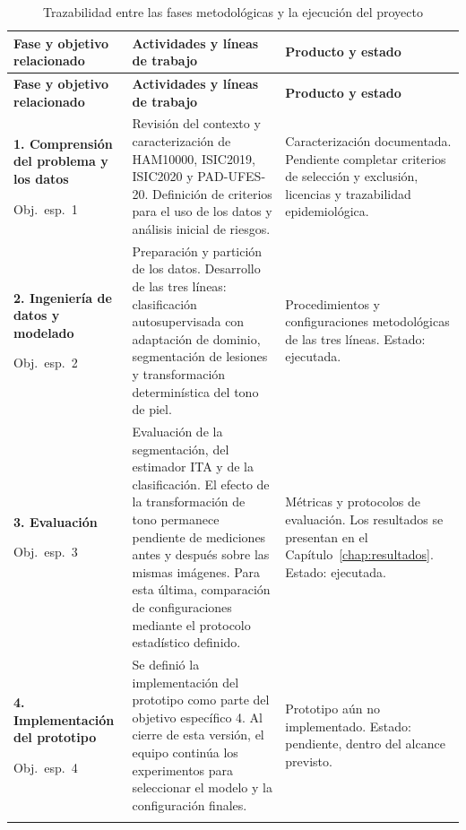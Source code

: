 \begingroup
\small
\singlespacing
\setlength{\tabcolsep}{4pt}
\begin{longtable}{@{}>{\raggedright\arraybackslash}p{}>{\raggedright\arraybackslash}p{}>{\raggedright\arraybackslash}p{}@{}}
\caption{Trazabilidad entre las fases metodológicas y la ejecución del proyecto}\label{tab:trazabilidad-fases}\\
\toprule
\textbf{Fase y objetivo relacionado} & \textbf{Actividades y líneas de trabajo} & \textbf{Producto y estado} \\
\midrule
\endfirsthead
\toprule
\textbf{Fase y objetivo relacionado} & \textbf{Actividades y líneas de trabajo} & \textbf{Producto y estado} \\
\midrule
\endhead
\bottomrule
\endfoot
\textbf{1. Comprensión del problema y los datos}\par\smallskip\mbox{Obj.\ esp.\ 1} & Revisión del contexto y caracterización de HAM10000, ISIC2019, ISIC2020 y PAD-UFES-20. Definición de criterios para el uso de los datos y análisis inicial de riesgos. & Caracterización documentada. Pendiente completar criterios de selección y exclusión, licencias y trazabilidad epidemiológica. \\
\addlinespace[5pt]
\textbf{2. Ingeniería de datos y modelado}\par\smallskip\mbox{Obj.\ esp.\ 2} & Preparación y partición de los datos. Desarrollo de las tres líneas: clasificación autosupervisada con adaptación de dominio, segmentación de lesiones y transformación determinística del tono de piel. & Procedimientos y configuraciones metodológicas de las tres líneas. Estado: ejecutada. \\
\addlinespace[5pt]
\textbf{3. Evaluación}\par\smallskip\mbox{Obj.\ esp.\ 3} & Evaluación de la segmentación, del estimador ITA y de la clasificación. El efecto de la transformación de tono permanece pendiente de mediciones antes y después sobre las mismas imágenes. Para esta última, comparación de configuraciones mediante el protocolo estadístico definido. & Métricas y protocolos de evaluación. Los resultados se presentan en el Capítulo~\ref{chap:resultados}. Estado: ejecutada. \\
\addlinespace[5pt]
\textbf{4. Implementación del prototipo}\par\smallskip\mbox{Obj.\ esp.\ 4} & Se definió la implementación del prototipo como parte del objetivo específico 4. Al cierre de esta versión, el equipo continúa los experimentos para seleccionar el modelo y la configuración finales. & Prototipo aún no implementado. Estado: pendiente, dentro del alcance previsto. \\
\addlinespace[5pt]
\end{longtable}
